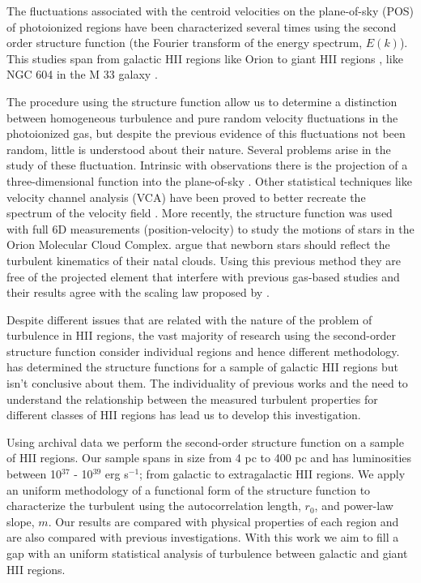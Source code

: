 \documentclass[fleqn,usenatbib, useAMS, a4paper]{mnras}
\begin{document}
The fluctuations associated with the centroid velocities on the plane-of-sky (POS) of photoionized regions have been characterized several times using the second order structure function (the Fourier transform of the energy spectrum, $E(k)$).
This studies span from galactic HII regions \citep{1986ApJ...300..624R} like Orion \citep{von1951methode,munch1958internal,castaneda1988,1992ApJ...387..229O,arthur2016turbulence} to giant HII regions \citep{1961MNRAS.122....1F,lagrois2009multi,lagrois2011}, like NGC 604 in the M 33 galaxy \citep{tanco1997,2019arXiv191203543M}.

The procedure using the structure function allow us to determine a distinction between homogeneous turbulence and pure random velocity fluctuations in the photoionized gas, but despite the previous evidence of this fluctuations not been random, little is understood about their nature.
Several problems arise in the study of these fluctuation.
Intrinsic with observations there is the projection of a three-dimensional function into the plane-of-sky \citep{von1951methode,munch1958internal}.
Other statistical techniques like velocity channel analysis (VCA) \citep{2000ApJ...537..720L} have been proved to better recreate the spectrum of the velocity field \citep{medina2014,arthur2016turbulence}.
More recently, the structure function was used with full 6D measurements (position-velocity) to study the motions of stars in the Orion Molecular Cloud Complex.
\citet{2021ApJ...907L..40H} argue that newborn stars should reflect the turbulent kinematics of their natal clouds.
Using this previous method they are free of the projected element that interfere with previous gas-based studies and their results agree with the scaling law proposed by \citet{1981MNRAS.194..809L}.


Despite different issues that are related with the nature of the problem of turbulence in HII regions, the vast majority of research using the second-order structure function consider individual regions and hence different methodology.
\citet{1987ApJ...317..686O} has determined the structure functions for a sample of galactic HII regions but isn't conclusive about them.
The individuality of previous works and the need to understand the relationship between the measured turbulent properties for different classes of HII regions has lead us to develop this investigation.


Using archival data we perform the second-order structure function on a sample of HII regions.
Our sample spans in size from 4 pc to 400 pc and has luminosities between 10\(^{37}\) - 10\(^{39}\) erg s\(^{-1}\); from galactic to extragalactic HII regions.
We apply an uniform methodology of a functional form of the structure function to characterize the turbulent using the  autocorrelation length, \(r_0\), and power-law slope, \(m\).
Our results are compared with physical properties of each region and are also compared with previous investigations.
With this work we aim to fill a gap with an uniform statistical analysis of turbulence between galactic and giant HII regions.
\end{document}
